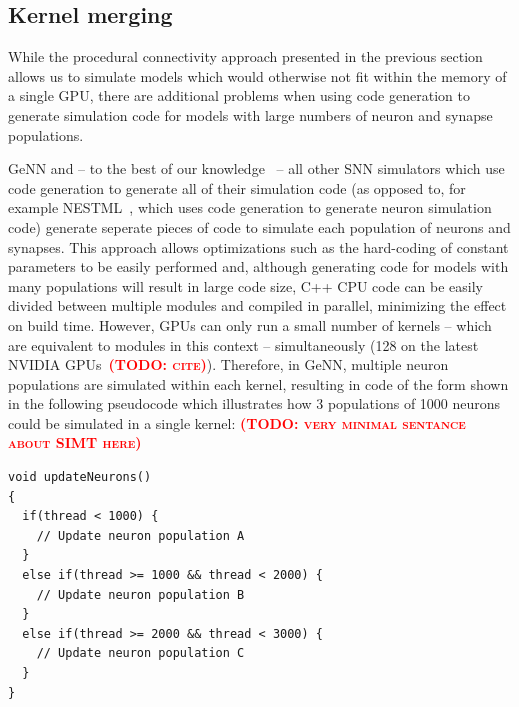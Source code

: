 \documentclass[9pt,twocolumn,twoside,lineno]{pnas-new}
\newcommand{\todo}[1]{\textbf{\textsc{\textcolor{red}{(TODO: #1)}}}}
\begin{document}
\subsection*{Kernel merging}
While the procedural connectivity approach presented in the previous section allows us to simulate models which would otherwise not fit within the memory of a single GPU, there are additional problems when using code generation to generate simulation code for models with large numbers of neuron and synapse populations.

GeNN and -- to the best of our knowledge~\citep{Blundell2018} -- all other SNN simulators which use code generation to generate all of their simulation code (as opposed to, for example NESTML~\citep{Plotnikov2016}, which uses code generation to generate neuron simulation code) generate seperate pieces of code to simulate each population of neurons and synapses.
This approach allows optimizations such as the hard-coding of constant parameters to be easily performed and, although generating code for models with many populations will result in large code size, C++ CPU code  can be easily divided between multiple modules and compiled in parallel, minimizing the effect on build time.
However, GPUs can only run a small number of kernels -- which are equivalent to modules in this context --  simultaneously (128 on the latest NVIDIA GPUs~\todo{cite}).
Therefore, in GeNN, multiple neuron populations are simulated within each kernel, resulting in code of the form shown in the following pseudocode which illustrates how 3 populations of 1000 neurons could be simulated in a single kernel:
\todo{very minimal sentance about SIMT here}

\begin{lstlisting}
void updateNeurons()
{
  if(thread < 1000) {
    // Update neuron population A
  }
  else if(thread >= 1000 && thread < 2000) {
    // Update neuron population B
  }
  else if(thread >= 2000 && thread < 3000) {
    // Update neuron population C
  }
}

\end{lstlisting}
\end{document}
